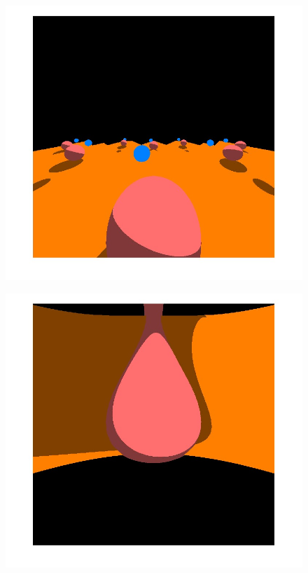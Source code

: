 \documentclass[titlepage]{article}
\begin{document}
\begin{figure}[H]
\begin{minipage}{.33\textwidth}
  \includegraphics[width=1\linewidth]{Images/Torus.jpg}
  \label{fig:2sphRays}
\end{minipage}
\begin{minipage}{.33\textwidth}
  \centering
  \includegraphics[width=1\linewidth]{Images/2Sphere.jpg}
  \label{fig:2sphRays}
\end{minipage}
\end{figure}
\end{document}
